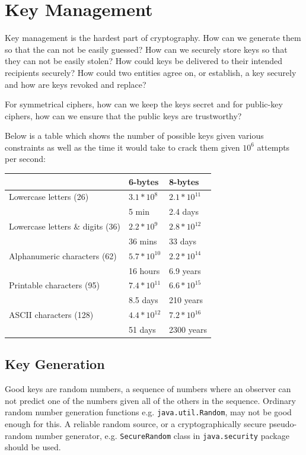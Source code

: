 \documentclass{article}
\begin{document}
\section{Key Management}
Key management is the hardest part of cryptography. How can we generate them so that the can not be easily guessed? How can we securely store keys so that they can not be easily stolen? How could keys be delivered to their intended recipients securely? How could two entities agree on, or establish, a key securely and how are keys revoked and replace?

For symmetrical ciphers, how can we keep the keys secret and for public-key ciphers, how can we ensure that the public keys are trustworthy?

Below is a table which shows the number of possible keys given various constraints as well as the time it would take to crack them given $10^{6}$ attempts per second:
\begin{center}
  \begin{tabular}{lll}
    \hline
    & 6-bytes & 8-bytes \\
    \hline
    Lowercase letters (26) & $3.1 * 10^{8}$ & $2.1 * 10^{11}$ \\
    & 5 min & 2.4 days \\
    Lowercase letters \& digits (36) & $2.2 * 10^{9}$ & $2.8 * 10^{12}$ \\
    & 36 mins & 33 days \\
    Alphanumeric characters (62) & $5.7 * 10^{10}$ & $2.2 * 10^{14}$ \\
    & 16 hours & 6.9 years \\
    Printable characters (95) & $7.4 * 10^{11}$ & $6.6 * 10^{15}$ \\
    & 8.5 days & 210 years \\
    ASCII characters (128) & $4.4 * 10^{12}$ & $7.2 * 10^{16}$ \\
    & 51 days & 2300 years
  \end{tabular}
\end{center}

\subsection{Key Generation}
Good keys are random numbers, a sequence of numbers where an observer can not predict one of the numbers given all of the others in the sequence. Ordinary random number generation functions e.g. \texttt{java.util.Random}, may not be good enough for this. A reliable random source, or a cryptographically secure pseudo-random number generator, e.g. \texttt{SecureRandom} class in \texttt{java.security} package should be used.
\end{document}
